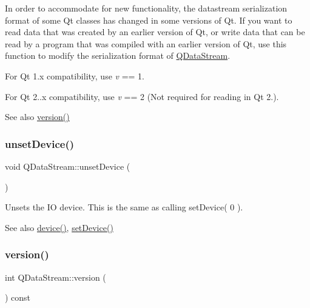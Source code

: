 In order to accommodate for new functionality, the datastream serialization format of some Qt classes has changed in some versions of Qt. If you want to read data that was created by an earlier version of Qt, or write data that can be read by a program that was compiled with an earlier version of Qt, use this function to modify the serialization format of \mbox{\hyperlink{class_q_data_stream}{Q\+Data\+Stream}}.

For Qt 1.\+x compatibility, use {\itshape v} == 1.

For Qt 2..\+x compatibility, use {\itshape v} == 2 (Not required for reading in Qt 2.).

\begin{DoxySeeAlso}{See also}
\mbox{\hyperlink{class_q_data_stream_aefd5c051bac9c9131295d3c6695c673b}{version()}} 
\end{DoxySeeAlso}
\mbox{\label{class_q_data_stream_a00d9db572b7ce41ea1a8b321b024acbd}} 
\subsubsection{\texorpdfstring{unsetDevice()}{unsetDevice()}}
{\footnotesize\ttfamily void Q\+Data\+Stream\+::unset\+Device (\begin{DoxyParamCaption}{ }\end{DoxyParamCaption})}

Unsets the IO device. This is the same as calling set\+Device( 0 ). \begin{DoxySeeAlso}{See also}
\mbox{\hyperlink{class_q_data_stream_adb4db2f7dc90c1eb08bcbe1707af2266}{device()}}, \mbox{\hyperlink{class_q_data_stream_aa05d0c83cccfb3f193c365c6ee3bb323}{set\+Device()}} 
\end{DoxySeeAlso}
\mbox{\label{class_q_data_stream_aefd5c051bac9c9131295d3c6695c673b}} 
\subsubsection{\texorpdfstring{version()}{version()}}
{\footnotesize\ttfamily int Q\+Data\+Stream\+::version (\begin{DoxyParamCaption}{ }\end{DoxyParamCaption}) const\hspace{0.3cm}{\ttfamily [inline]}}

